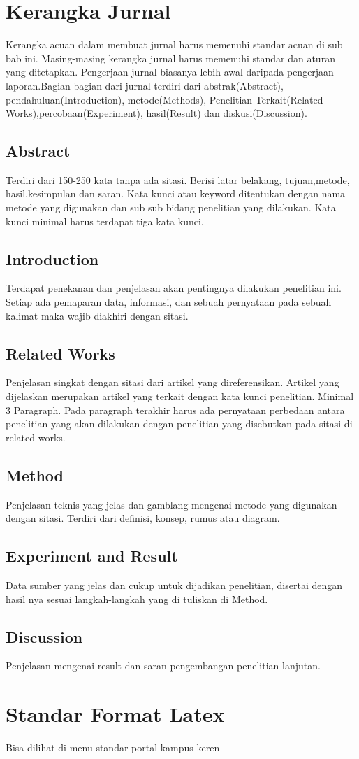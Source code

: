 \section{Kerangka Jurnal}
Kerangka acuan dalam membuat jurnal harus memenuhi standar acuan di sub bab ini. Masing-masing kerangka jurnal harus memenuhi standar dan aturan yang ditetapkan. Pengerjaan jurnal biasanya lebih awal daripada pengerjaan laporan.Bagian-bagian dari jurnal terdiri dari abstrak(Abstract), pendahuluan(Introduction), metode(Methods), Penelitian Terkait(Related Works),percobaan(Experiment), hasil(Result) dan diskusi(Discussion).
\subsection{Abstract}
Terdiri dari 150-250 kata tanpa ada sitasi. Berisi latar belakang, tujuan,metode, hasil,kesimpulan dan saran. Kata kunci atau keyword ditentukan dengan nama metode yang digunakan dan sub sub bidang penelitian yang dilakukan. Kata kunci minimal harus terdapat tiga kata kunci.

\subsection{Introduction}
Terdapat penekanan dan penjelasan akan pentingnya dilakukan penelitian ini. Setiap ada pemaparan data, informasi, dan sebuah pernyataan pada sebuah kalimat maka wajib diakhiri dengan sitasi.

\subsection{Related Works}
Penjelasan singkat dengan sitasi dari artikel yang direferensikan. Artikel yang dijelaskan merupakan artikel yang terkait dengan kata kunci penelitian. Minimal 3 Paragraph. Pada paragraph terakhir harus ada pernyataan perbedaan antara penelitian yang akan dilakukan dengan penelitian yang disebutkan pada sitasi di related works.

\subsection{Method}

Penjelasan teknis yang jelas dan gamblang mengenai metode yang digunakan dengan sitasi. Terdiri dari definisi, konsep, rumus atau diagram.

\subsection{Experiment and Result}
Data sumber yang jelas dan cukup untuk dijadikan penelitian, disertai dengan hasil nya sesuai langkah-langkah yang di tuliskan di Method.

\subsection{Discussion}
Penjelasan mengenai result dan saran pengembangan penelitian lanjutan.


\section{Standar Format Latex}
Bisa dilihat di menu standar portal kampus keren